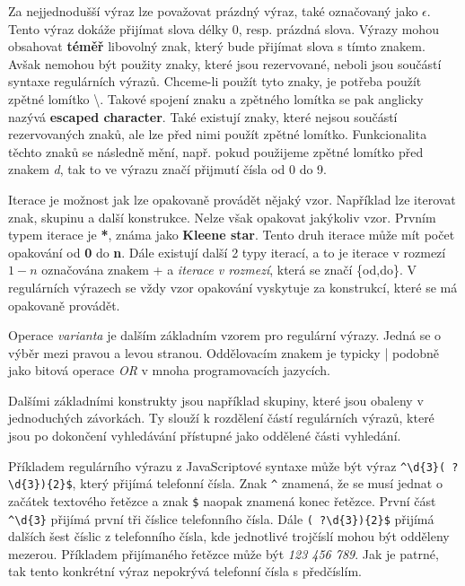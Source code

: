 Za nejjednodušší výraz lze považovat prázdný výraz, také označovaný jako $\epsilon$. 
Tento výraz dokáže přijímat slova délky 0, resp. prázdná slova.
Výrazy mohou obsahovat \textbf{téměř} libovolný znak, který bude přijímat slova s tímto znakem. 
Avšak nemohou být použity znaky, které jsou rezervované, neboli jsou součástí syntaxe regulárních výrazů.
Chceme-li použít tyto znaky, je potřeba použít zpětné lomítko \textbackslash. 
Takové spojení znaku a zpětného lomítka se pak anglicky nazývá \textbf{escaped character}.
Také existují znaky, které nejsou součástí rezervovaných znaků, ale lze před nimi použít zpětné lomítko.
Funkcionalita těchto znaků se následně mění, např. pokud použijeme zpětné lomítko před znakem \textit{d}, tak to ve výrazu značí přijmutí čísla od 0 do 9.

Iterace je možnost jak lze opakovaně provádět nějaký vzor.
Například lze iterovat znak, skupinu a další konstrukce. 
Nelze však opakovat jakýkoliv vzor.
Prvním typem iterace je \textbf{*}, známa jako \textbf{Kleene star}.
Tento druh iterace může mít počet opakování od \textbf{0} do \textbf{n}. 
Dále existují další 2 typy iterací, a to je iterace v rozmezí $1-n$ označována znakem + a \textit{iterace v rozmezí}, která se značí \{od,do\}.
V regulárních výrazech se vždy vzor opakování vyskytuje za konstrukcí, které se má opakovaně provádět.

Operace \textit{varianta} je dalším základním vzorem pro regulární výrazy. 
Jedná se o výběr mezi pravou a levou stranou. 
Oddělovacím znakem je typicky | podobně jako bitová operace \textit{OR} v mnoha programovacích jazycích.

Dalšími základními konstrukty jsou například skupiny, které jsou obaleny v jednoduchých závorkách.
Ty slouží k rozdělení částí regulárních výrazů, které jsou po dokončení vyhledávání přístupné jako oddělené části vyhledání.

Příkladem regulárního výrazu z JavaScriptové syntaxe může být výraz \texttt{\textasciicircum \textbackslash d\{3\}(~?\textbackslash d\{3\})\{2\}\$}, který přijímá telefonní čísla.
Znak \texttt{\textasciicircum} znamená, že se musí jednat o začátek textového řetězce a znak \texttt{\$} naopak znamená konec řetězce. 
První část \texttt{\textasciicircum \textbackslash d\{3\}} přijímá první tři číslice telefonního čísla.
Dále \texttt{(~?\textbackslash d\{3\})\{2\}\$} přijímá dalších šest číslic z telefonního čísla, kde jednotlivé trojčíslí mohou být odděleny mezerou.
Příkladem přijímaného řetězce může být \textit{123 456 789}.
Jak je patrné, tak tento konkrétní výraz nepokrývá telefonní čísla s předčíslím.


